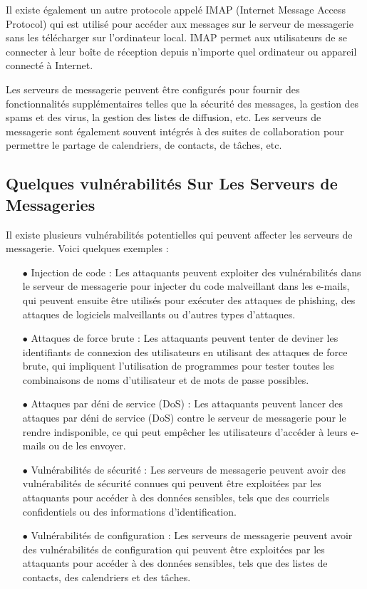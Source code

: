 Il existe également un autre protocole appelé IMAP (Internet Message Access Protocol) qui est utilisé pour accéder aux messages sur le serveur de messagerie sans les télécharger sur l'ordinateur local. IMAP permet aux utilisateurs de se connecter à leur boîte de réception depuis n'importe quel ordinateur ou appareil connecté à Internet.

Les serveurs de messagerie peuvent être configurés pour fournir des fonctionnalités supplémentaires telles que la sécurité des messages, la gestion des spams et des virus, la gestion des listes de diffusion, etc. Les serveurs de messagerie sont également souvent intégrés à des suites de collaboration pour permettre le partage de calendriers, de contacts, de tâches, etc.
\subsection{Quelques vulnérabilités Sur Les Serveurs de Messageries }
Il existe plusieurs vulnérabilités potentielles qui peuvent affecter les serveurs de messagerie. Voici quelques exemples :
\begin{itemize}
	\item[$\bullet$]Injection de code : Les attaquants peuvent exploiter des vulnérabilités dans le serveur de messagerie pour injecter du code malveillant dans les e-mails, qui peuvent ensuite être utilisés pour exécuter des attaques de phishing, des attaques de logiciels malveillants ou d'autres types d'attaques.
	
	
	\item[$\bullet$] Attaques de force brute : Les attaquants peuvent tenter de deviner les identifiants de connexion des utilisateurs en utilisant des attaques de force brute, qui impliquent l'utilisation de programmes pour tester toutes les combinaisons de noms d'utilisateur et de mots de passe possibles.
	
	
	\item[$\bullet$] Attaques par déni de service (DoS) : Les attaquants peuvent lancer des attaques par déni de service (DoS) contre le serveur de messagerie pour le rendre indisponible, ce qui peut empêcher les utilisateurs d'accéder à leurs e-mails ou de les envoyer.
	
	
	\item[$\bullet$]Vulnérabilités de sécurité : Les serveurs de messagerie peuvent avoir des vulnérabilités de sécurité connues qui peuvent être exploitées par les attaquants pour accéder à des données sensibles, tels que des courriels confidentiels ou des informations d'identification.
	
	
	\item[$\bullet$] Vulnérabilités de configuration : Les serveurs de messagerie peuvent avoir des vulnérabilités de configuration qui peuvent être exploitées par les attaquants pour accéder à des données sensibles, tels que des listes de contacts, des calendriers et des tâches.
	 
\end{itemize}

